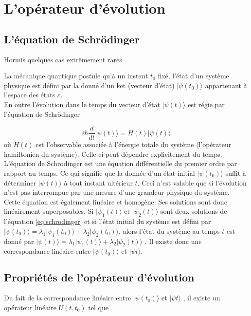 \documentclass[a4paper, 12pt]{report}
\begin{document}
\chapter{L’opérateur d’évolution}
\section{L’équation de Schrödinger}Hormis quelques cas extrêmement rares

La mécanique quantique postule qu’à un instant $t_0$ fixé, l’état d’un système physique
est défini par la donné d’un ket (vecteur d’état) $|\psi(t_0)\rangle $ appartenant à l’espace des états $\displaystyle \varepsilon$.\\
En outre l’évolution dans le temps du vecteur d’état $|\psi(t)\rangle $ est régie par l’équation
de Schrödinger

 \begin{equation}
  i\hbar\frac{d}{dt}|\psi(t)\rangle = H(t)|\psi(t)\rangle
  \label{eq:schrodinger}
 \end{equation}
où $H(t)$ est l’observable associée à l’énergie totale du système (l’opérateur hamiltonien
du système). Celle-ci peut dépendre explicitement du temps. \\

\noindent
L’équation de Schrödinger est une équation différentielle du premier ordre par
rapport au temps. Ce qui signifie que la donnée d’un état initial $|\psi(t_0)\rangle$ suffit à déterminer $|\psi(t)\rangle$ à tout instant ultérieur $t$. Ceci n’est valable que si l’évolution n’est
pas interrompue par une mesure d’une grandeur physique du système. \\
Cette équation est également linéaire et homogène. Ses solutions sont donc linéairement
superposables. Si $|\psi_1(t)\rangle$ et $|\psi_2(t)\rangle$ sont deux solutions de l’équation \eqref{eq:schrodinger} et si l’état
initial du système est défini par $|\psi(t_0)\rangle = \lambda_1|\psi_1(t_0)\rangle + \lambda_2|\psi_2(t_0)\rangle $, alors l’état du
système au temps $t$ est donné par $|\psi(t)\rangle = \lambda_1|\psi_1(t)\rangle + \lambda_2|\psi_2(t)\rangle $ . Il existe donc une
correspondance linéaire entre $|\psi(t_0)\rangle$ et $|\psi{t}\rangle $.

\section{Propriétés de l’opérateur d’évolution}

Du fait de la correspondance linéaire entre $|\psi(t_0)\rangle$ et $|\psi{t}\rangle $ , il existe un opérateur
linéaire $U(t,t_0)$ tel que 
\end{document}
